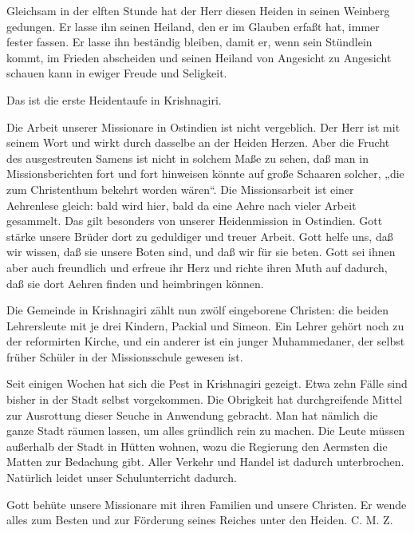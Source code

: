 Gleichsam in der elften Stunde hat der Herr diesen Heiden in seinen Weinberg gedungen. Er lasse ihn seinen Heiland, den er im Glauben erfaßt hat, immer fester fassen. Er lasse ihn beständig bleiben, damit er, wenn sein Stündlein kommt, im Frieden abscheiden und seinen Heiland von Angesicht zu Angesicht schauen kann in ewiger Freude und Seligkeit.

Das ist die erste Heidentaufe in Krishnagiri.

Die Arbeit unserer Missionare in Ostindien ist nicht vergeblich. Der Herr ist mit seinem Wort und wirkt durch dasselbe an der Heiden Herzen. Aber die Frucht des ausgestreuten Samens ist nicht in solchem Maße zu sehen, daß man in Missionsberichten fort und fort hinweisen könnte auf große Schaaren solcher, „die zum Christenthum bekehrt worden wären“. Die Missionsarbeit ist einer Aehrenlese gleich: bald wird hier, bald da
eine Aehre nach vieler Arbeit gesammelt. Das gilt besonders von unserer Heidenmission in Ostindien. Gott stärke unsere Brüder dort zu geduldiger und treuer Arbeit. Gott helfe uns, daß wir wissen, daß sie unsere Boten sind, und daß wir für sie beten. Gott sei ihnen aber auch freundlich und erfreue ihr Herz und richte ihren Muth auf dadurch, daß sie dort Aehren finden und heimbringen können.

Die Gemeinde in Krishnagiri zählt nun zwölf eingeborene Christen: die beiden Lehrersleute mit je drei Kindern, Packial und Simeon. Ein Lehrer gehört noch zu der reformirten Kirche, und ein anderer ist ein junger Muhammedaner, der selbst früher Schüler in der Missionsschule gewesen ist.

Seit einigen Wochen hat sich die Pest in Krishnagiri gezeigt. Etwa zehn Fälle sind bisher in der Stadt selbst vorgekommen. Die Obrigkeit hat durchgreifende Mittel zur Ausrottung dieser Seuche in Anwendung gebracht. Man hat nämlich die ganze Stadt räumen lassen, um alles gründlich rein zu machen. Die Leute müssen außerhalb der Stadt in Hütten wohnen, wozu die Regierung den Aermsten die Matten zur Bedachung gibt. Aller Verkehr und Handel ist dadurch unterbrochen. Natürlich leidet unser Schulunterricht dadurch.

Gott behüte unsere Missionare mit ihren Familien und unsere Christen. Er wende alles zum Besten und zur Förderung seines Reiches unter den Heiden. C. M. Z.
